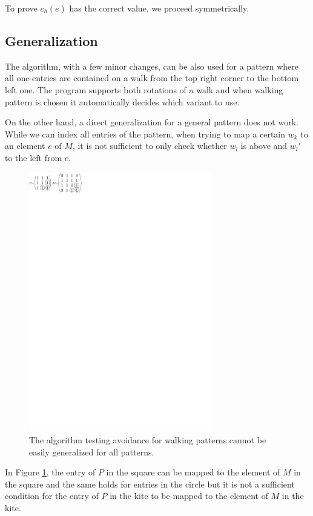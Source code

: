 To prove $c_h(e)$ has the correct value, we proceed symmetrically.

\subsection{Generalization}
The algorithm, with a few minor changes, can be also used for a pattern where all one-entries are contained on a walk from the top right corner to the bottom left one. The program supports both rotations of a walk and when walking pattern is chosen it automatically decides which variant to use.

On the other hand, a direct generalization for a general pattern does not work. While we can index all entries of the pattern, when trying to map a certain $w_k$ to an element $e$ of $M$, it is not sufficient to only check whether $w_l$ is above and $w_l'$ to the left from $e$.
\begin{figure}[h!]
\centering
\includegraphics[width=80mm]{../img/nogeneral.pdf}
\caption{The algorithm testing avoidance for walking patterns cannot be easily generalized for all patterns.}
\label{nogeneral}
\end{figure}

In Figure \ref{nogeneral}, the entry of $P$ in the square can be mapped to the element of $M$ in the square and the same holds for entries in the circle but it is not a sufficient condition for the entry of $P$ in the kite to be mapped to the element of $M$ in the kite.
